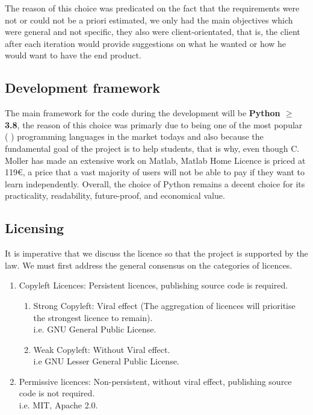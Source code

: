 The reason of this choice was predicated on the fact that the requirements were not or could not be a priori estimated, we only had the main objectives which were general and not specific, they also were client-orientated, that is, the client after each iteration would provide suggestions on what he wanted or how he would want to have the end product.

\subsection{Development framework}
The main framework for the code during the development will be \textbf{Python $\ge$ 3.8}, the reason of this choice was primarly due to being one of the most popular (\cite{tiobe,PYPL} ) programming languages in the market todays and also because the fundamental goal of the project is to help students, that is why, even though C. Moller has made an extensive work on Matlab, Matlab Home Licence is priced at 119€, a price that a vast majority of users will not be able to pay if they want to learn independently. Overall, the choice of Python remains a decent choice for its practicality, readability, future-proof, and economical value.

\subsection{Licensing}
It is imperative that we discuss the licence so that the project is supported by the law. We must first address the general consensus on the categories of licences.
\begin{enumerate}
    \item Copyleft Licences: Persistent licences, publishing source code is required.
        \begin{enumerate}
            \item Strong Copyleft: Viral effect (The aggregation of licences will prioritise the strongest licence to remain).\\
            i.e. GNU General Public License.
            \item Weak Copyleft: Without Viral effect.\\
            i.e GNU Lesser General Public License.
        \end{enumerate}
    \item Permissive licences: Non-persistent, without viral effect, publishing source code is not required.\\
    i.e. MIT, Apache 2.0.
\end{enumerate}


